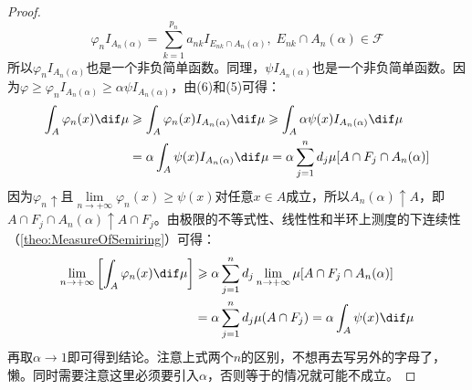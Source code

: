 \begin{proof}
	\begin{equation*}
		\varphi_nI_{A_n(\alpha)}=\sum_{k=1}^{p_n}a_{nk}I_{E_{nk}\cap A_n(\alpha)},\;E_{nk}\cap A_n(\alpha)\in \mathscr{F}
	\end{equation*}
	所以$\varphi_nI_{A_n(\alpha)}$也是一个非负简单函数。同理，$\psi I_{A_n(\alpha)}$也是一个非负简单函数。因为$\varphi\geqslant\varphi_nI_{A_n(\alpha)}\geqslant\alpha\psi I_{A_n(\alpha)}$，由(6)和(5)可得：
	\begin{align*}
		\int_{A}^{}\varphi_n(x)\dif\mu
		&\geqslant\int_{A}^{}\varphi_n(x)I_{A_n(\alpha)}\dif\mu\geqslant\int_{A}\alpha\psi(x)I_{A_n(\alpha)}\dif\mu \\
		&=\alpha\int_{A}^{}\psi(x)I_{A_n(\alpha)}\dif\mu
		=\alpha\sum_{j=1}^{n}d_j\mu[A\cap F_j\cap A_n(\alpha)]
	\end{align*}
	因为$\varphi_n\uparrow$且$\lim\limits_{n\to+\infty}\varphi_n(x)\geqslant\psi(x)$对任意$x\in A$成立，所以$A_n(\alpha)\uparrow A$，即$A\cap F_j\cap A_n(\alpha)\uparrow A\cap F_j$。由极限的不等式性、线性性和半环上测度的下连续性（\cref{theo:MeasureOfSemiring}）可得：
	\begin{align*}
		\lim_{n\to+\infty}\left[\int_{A}^{}\varphi_n(x)\dif\mu\right]&\geqslant\alpha\sum_{j=1}^{n}d_j\lim_{n\to+\infty}\mu[A\cap F_j\cap A_n(\alpha)] \\
		&=\alpha\sum_{j=1}^{n}d_j\mu(A\cap F_j)=\alpha\int_{A}^{}\psi(x)\dif\mu
	\end{align*}
	再取$\alpha\to 1$即可得到结论。注意上式两个$n$的区别，不想再去写另外的字母了，懒。同时需要注意这里必须要引入$\alpha$，否则等于的情况就可能不成立。
\end{proof}

